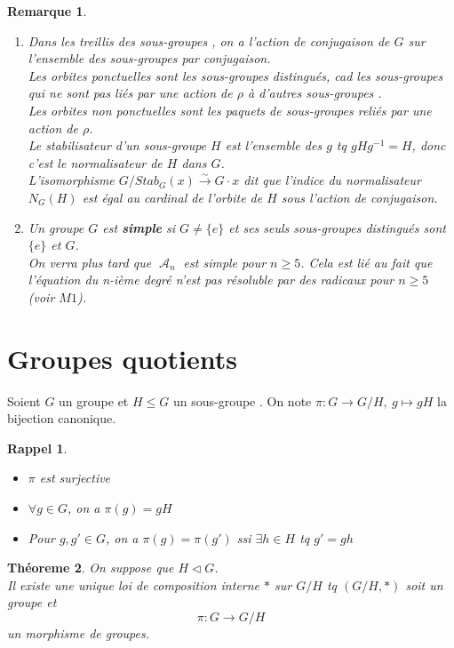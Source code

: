 \documentclass[a4paper, oneside]{report}
\theoremstyle{break}
\newtheorem{thm}{Théoreme}[section] %
\newtheorem{remar}[thm]{Remarque}
\newtheorem*{rappel}{Rappel}
\newcommand{\sg}{sous-groupe }
\newcommand{\sgs}{sous-groupes }
\newcommand{\fong}{\overset{\sim}{\rightarrow}}
\DeclareMathOperator{\A}{\mathcal{A}}
\begin{document}
\begin{remar}
\begin{enumerate}
\item Dans les treillis des \sgs, on a l'action de conjugaison de $G$ sur l'ensemble des \sgs par conjugaison.\\
Les orbites ponctuelles sont les \sgs distingués, cad les \sgs qui ne sont pas liés par une action de $\rho$ à d'autres \sgs.\\
Les orbites non ponctuelles sont les paquets de \sgs reliés par une action de $\rho$.\\
Le stabilisateur d'un \sg $H$ est l'ensemble des $g$ tq $gHg^{-1}=H$, donc c'est le normalisateur de $H$ dans $G$.\\
L'isomorphisme $G/Stab_G(x)\fong G\cdot x$ dit que l'indice du normalisateur $N_G(H)$ est égal au cardinal de l'orbite de $H$ sous l'action de conjugaison.

\item Un groupe $G$ est \textbf{simple} si $G\neq \{e\}$ et ses seuls \sgs distingués sont $\{e\}$ et $G$.\\
On verra plus tard que $\A_n$ est simple pour $n\geq 5$. Cela est lié au fait que l'équation du n-ième degré n'est pas résoluble par des radicaux pour $n\geq 5$ (voir $M1$).
\end{enumerate}
\end{remar}

\section{Groupes quotients}

Soient $G$ un groupe et $H \leq G$ un \sg. On note $\pi : G \rightarrow G/H,~g\mapsto gH$ la bijection canonique.

\begin{rappel}
\begin{itemize}
\item $\pi$ est surjective
\item $\forall g\in G$, on a $\pi(g)=gH$
\item Pour $g,g' \in G$, on a $\pi(g)=\pi(g')$ ssi $\exists h \in H$ tq $g'=gh$
\end{itemize}
\end{rappel}

\begin{thm}
\label{thm_comp_int}
On suppose que $H\vartriangleleft G$.\\
Il existe une unique loi de composition interne $*$ sur $G/H$ tq $(G/H,*)$ soit un groupe et 
$$\pi : G \rightarrow G/H$$
un morphisme de groupes.
\end{thm}
\end{document}
